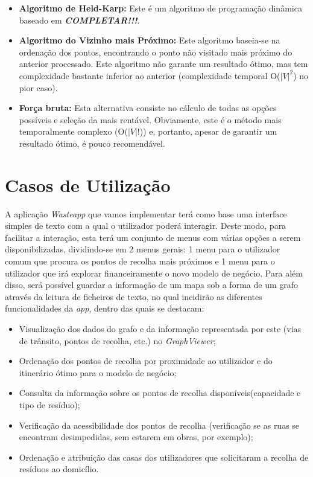 \documentclass[article, a4paper, 12pt, oneside]{memoir}
\begin{document}
\begin{itemize}
\item \textbf{Algoritmo de Held-Karp:} Este é um algoritmo de programação dinâmica baseado em \textbf{\textit{COMPLETAR!!!}}.

\item \textbf{Algoritmo do Vizinho mais Próximo:} Este algoritmo baseia-se na ordenação dos pontos, encontrando o ponto não visitado mais próximo do anterior processado. Este algoritmo não garante um resultado ótimo, mas tem complexidade bastante inferior ao anterior (complexidade temporal O($|V|^2$) no pior caso).

\item \textbf{Força bruta:} Esta alternativa consiste no cálculo de todas as opções possíveis e seleção da mais rentável. Obviamente, este é o método mais temporalmente complexo (O($|V|!$)) e, portanto, apesar de garantir um resultado ótimo, é pouco recomendável.
\end{itemize}


\newpage

\newpage
\chapter[Casos de Utilização][Casos de Utilização]{Casos de Utilização} \label{\thechapter}

A aplicação \textit{Wasteapp} que vamos implementar terá como base uma interface simples de texto com a qual o utilizador poderá interagir. Deste modo, para facilitar a interação, esta terá um conjunto de menus com várias opções a serem disponibilizadas, dividindo-se em 2 menus gerais: 1 menu para o utilizador comum que procura os pontos de recolha mais próximos e 1 menu para o utilizador que irá explorar financeiramente o novo modelo de negócio.
Para além disso, será possível guardar a informação de um mapa sob a forma de um grafo através da leitura de ficheiros de texto, no qual incidirão as diferentes funcionalidades da \textit{app}, dentro das quais se destacam:

\begin{itemize}
\item Visualização dos dados do grafo e da informação representada por este (vias de trânsito, pontos de recolha, etc.) no \textit{GraphViewer};
\item Ordenação dos pontos de recolha por proximidade ao utilizador e do itinerário ótimo para o modelo de negócio;
\item Consulta da informação sobre os pontos de recolha disponíveis(capacidade e tipo de resíduo);
\item Verificação da acessibilidade dos pontos de recolha (verificação se as ruas se encontram desimpedidas, sem estarem em obras, por exemplo);
\item Ordenação e atribuição das casas dos utilizadores que solicitaram a recolha de resíduos ao domicílio.

\end{itemize}
\end{document}
